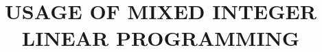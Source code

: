 \documentclass[onluarkali,ingilizce,yukseklisans,bez,LisansustuEgitim]{itutez}
\title{USAGE OF MIXED INTEGER LINEAR PROGRAMMING }{IN CRYPTANALYSIS OF BLOCK CIPHERS}{}
\begin{document}

                                       
                       
                      





        

%  

%

\ozgecmis{}
\end{document}
